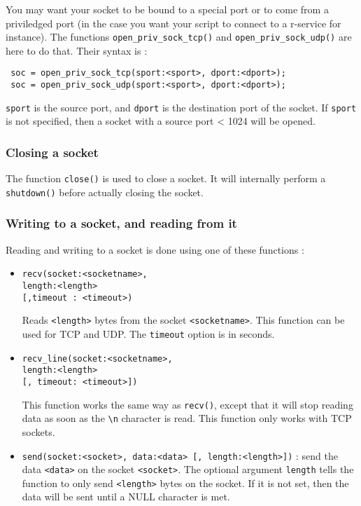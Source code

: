 \documentclass{article}
\begin{document}
You may want your socket to be bound to a special port or to come from
a priviledged port (in the case you want your script to connect to
a r-service for instance). The functions \verb+open_priv_sock_tcp()+ and
\verb+open_priv_sock_udp()+ are here to do that.
Their syntax is :
\begin{verbatim}
 soc = open_priv_sock_tcp(sport:<sport>, dport:<dport>);
 soc = open_priv_sock_udp(sport:<sport>, dport:<dport>);
\end{verbatim}

\verb+sport+ is the source port, and \verb+dport+ is the destination
port of the socket. If \verb+sport+ is not specified, then a socket
with a source port < 1024 will be opened.



\subsubsection{Closing a socket}

The function \verb+close()+ is used to close a socket. It will internally
perform a \verb+shutdown()+ before actually closing the socket.


\subsubsection{Writing to a socket, and reading from it}

Reading and writing to a socket is done using one of these functions :
\begin{itemize}
\item \begin{verbatim}recv(socket:<socketname>, 
length:<length> 
[,timeout : <timeout>)\end{verbatim} 
Reads  \verb+<length>+ bytes from the socket \verb+<socketname>+. 
This function can be used for TCP and UDP. The \verb+timeout+ option is in
seconds.
 
\item \begin{verbatim}recv_line(socket:<socketname>, 
length:<length> 
[, timeout: <timeout>])\end{verbatim}
This function
works the same way as \verb+recv()+, except that it will stop reading data
as soon as the \verb+\n+ character is read. This function only works
with TCP sockets.


\item \verb+send(socket:<socket>, data:<data> [, length:<length>])+ : 
send the data \verb+<data>+ on the socket \verb+<socket>+. The optional
argument \verb+length+ tells the function to only send \verb+<length>+
bytes on the socket. If it is not set, then the data will be sent until
a NULL character is met.


\end{itemize}
\end{document}

